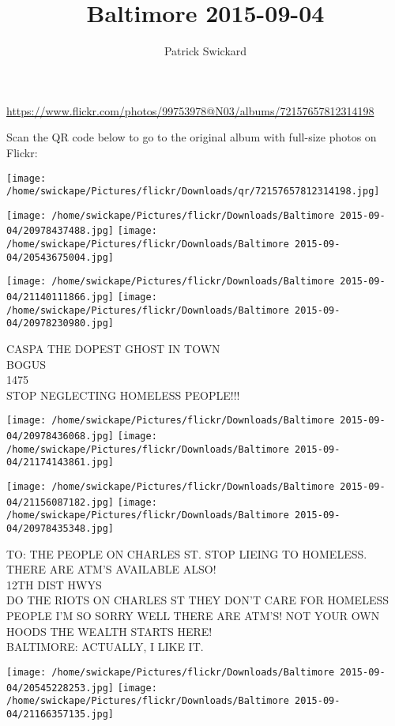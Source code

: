 \documentclass[10pt,letterpaper]{article}
\title{Baltimore 2015-09-04}
\author{Patrick Swickard}
\date{}
\begin{document}
\maketitle

\url{https://www.flickr.com/photos/99753978@N03/albums/72157657812314198}

Scan the QR code below to go to the original album with full-size photos on Flickr:

\texttt{[image: /home/swickape/Pictures/flickr/Downloads/qr/72157657812314198.jpg]}
\pagebreak

\texttt{[image: /home/swickape/Pictures/flickr/Downloads/Baltimore 2015-09-04/20978437488.jpg]}
\texttt{[image: /home/swickape/Pictures/flickr/Downloads/Baltimore 2015-09-04/20543675004.jpg]}

\texttt{[image: /home/swickape/Pictures/flickr/Downloads/Baltimore 2015-09-04/21140111866.jpg]}
\texttt{[image: /home/swickape/Pictures/flickr/Downloads/Baltimore 2015-09-04/20978230980.jpg]}

CASPA THE DOPEST GHOST IN TOWN\\
BOGUS\\
1475\\
STOP NEGLECTING HOMELESS PEOPLE!!!
\pagebreak

\texttt{[image: /home/swickape/Pictures/flickr/Downloads/Baltimore 2015-09-04/20978436068.jpg]}
\texttt{[image: /home/swickape/Pictures/flickr/Downloads/Baltimore 2015-09-04/21174143861.jpg]}

\texttt{[image: /home/swickape/Pictures/flickr/Downloads/Baltimore 2015-09-04/21156087182.jpg]}
\texttt{[image: /home/swickape/Pictures/flickr/Downloads/Baltimore 2015-09-04/20978435348.jpg]}

TO: THE PEOPLE ON CHARLES ST. STOP LIEING TO HOMELESS.  THERE ARE ATM'S AVAILABLE ALSO!\\
12TH DIST HWYS\\
DO THE RIOTS ON CHARLES ST THEY DON'T CARE FOR HOMELESS PEOPLE I'M SO SORRY WELL THERE ARE ATM'S!  NOT YOUR OWN HOODS THE WEALTH STARTS HERE!\\
BALTIMORE: ACTUALLY, I LIKE IT.
\pagebreak

\texttt{[image: /home/swickape/Pictures/flickr/Downloads/Baltimore 2015-09-04/20545228253.jpg]}
\texttt{[image: /home/swickape/Pictures/flickr/Downloads/Baltimore 2015-09-04/21166357135.jpg]}
\end{document}
